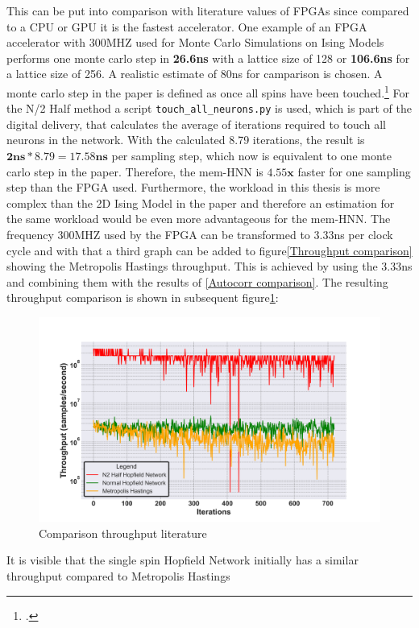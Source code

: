This can be put into comparison with literature values of \ac{FPGA}s since compared to a \ac{CPU} or \ac{GPU} it is the fastest accelerator.
One example of an \ac{FPGA} accelerator with 300MHZ used for Monte Carlo Simulations on Ising Models
performs one monte carlo step in \textbf{26.6ns} with a lattice size of 128 or \textbf{106.6ns} for a lattice size of 256.
A realistic estimate of 80ns for camparison is chosen. 
A monte carlo step in the paper is defined as once all spins have been touched.\footcite[cf.][4]{ortega-zamoranoFPGAHardwareAcceleration2016}
For the N/2 Half method a script \texttt{touch\_all\_neurons.py} is used, which is part of the digital delivery, that calculates  
the average of iterations required to touch all neurons in the network.
With the calculated 8.79 iterations, the result is \(\mathbf{2ns * 8.79 = 17.58ns}\) per sampling step, which now is equivalent to one monte carlo step in the paper.
Therefore, the \ac{mem-HNN} is \(\mathbf{4.55x}\) faster for one sampling step than the \ac{FPGA} used.
Furthermore, the workload in this thesis is more complex than the 2D Ising Model in the paper and therefore an estimation for the same 
workload would be even more advantageous for the \ac{mem-HNN}. 
The frequency 300MHZ used by the \ac{FPGA} can be transformed to 3.33ns per clock cycle and with that a third graph can be added to figure\ref{Throughput comparison} showing the Metropolis Hastings throughput.
This is achieved by using the 3.33ns and combining them with the results of \ref{Autocorr comparison}.
The resulting throughput comparison is shown in subsequent figure\ref{Comparison_throughput_literature_3}:
\begin{figure}[H]
    \centering
    \includegraphics[width=0.8\linewidth]{graphics/Visualisierungen_throughput_MODIFIED.png}
    \caption{Comparison throughput literature}
    \label{Comparison_throughput_literature_3}
\end{figure}
It is visible that the single spin Hopfield Network initially has a similar throughput compared to Metropolis Hastings 
